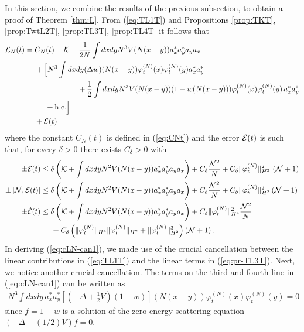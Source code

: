 \documentclass[11pt,a4paper]{article}
\newcommand{\cE}{{\cal E}}
\newcommand{\cK}{{\cal K}}
\newcommand{\cL}{{\cal L}}
\newcommand{\cN}{{\cal N}}
\begin{document}
In this section, we combine the results of the previous subsection, to obtain a proof of Theorem \ref{thm:L}. {F}rom (\ref{eq:TL1T}) and Propositions \ref{prop:TKT}, \ref{prop:TwtL2T}, \ref{prop:TL3T}, \ref{prop:TL4T} it follows that
\begin{equation}\label{eq:cLN-can1} \begin{split} 
\cL_N (t) = \; &C_N (t) + \cK  + \frac{1}{2N}  \int dx dy N^3 V (N (x-y)) a_x^* a_y^* a_y a_x \\
&+ \Big[ N^3 \int dx dy (\Delta w) (N (x-y)) \varphi_t^{(N)} (x) \varphi_t^{(N)} (y)  a_x^* a_y^* \\ 
&\hspace{2cm}+ \frac{1}{2} \int dx dy N^3 V(N (x-y)) (1- w(N(x-y))) \varphi_t^{(N)} (x) \varphi_t^{(N)} (y)\, a_x^* a_y^* \\&\hspace{.5cm}+ \text{h.c.} \Big]  
\\ &+ \cE (t) 
\end{split} \end{equation}
where the constant $C_N (t)$ is defined in (\ref{eq:CNt}) and the error $\cE (t)$ is such that, for every $\delta > 0$ there exists $C_\delta > 0$ with
\begin{equation}\label{eq:cE-tot}
\begin{split} \pm \cE (t) &\leq \delta \left( \cK + \int dx dy N^2 V(N (x-y)) a_x^* a_y^* a_y a_x \right) + C_\delta \frac{\cN^2}{N} + C_\delta \| \varphi_t^{(N)} \|_{H^2}^2 \, \left( \cN + 1 \right) \\
\pm \left[ \cN ,  \cE (t)\right]  &\leq \delta \left( \cK + \int dx dy N^2 V(N (x-y)) a_x^* a_y^* a_y a_x \right) + C_\delta \frac{\cN^2}{N}  + C_\delta \| \varphi^{(N)}_t \|_{H^2}^2 \left( \cN + 1 \right)\\
\pm \dot{\cE} (t) & \leq \delta \left( \cK + \int dx dy N^2 V(N (x-y)) a_x^* a_y^* a_y a_x \right) + C_\delta \| \varphi_t^{(N)} \|_{H^4}^2 \frac{\cN^2}{N} \\ &\hspace{.5cm} + C_\delta \left( \| \varphi_t^{(N)} \|_{H^4}  \| \varphi_t^{(N)} \|_{H^2} + \| \varphi_t^{(N)} \|_{H^2}^3 \right) \left(\cN+1 \right). 
\end{split} \end{equation}
In deriving (\ref{eq:cLN-can1}), we made use of the crucial cancellation between the linear contributions in (\ref{eq:TL1T}) and the linear terms in (\ref{eq:pr-TL3T}).  Next, we notice another crucial cancellation. The terms on the third and fourth line in (\ref{eq:cLN-can1}) can be written as
\[ \begin{split} 
N^3 \int dx dy \, a_x^* a_y^* \left[ \left(-\Delta +\frac{1}{2} V \right)(1-w) \right](N(x-y)) \varphi_t^{(N)} (x) \varphi_t^{(N)} (y) = 0 
\end{split}\]
since $f = 1-w$ is a solution of the zero-energy scattering equation $(-\Delta + (1/2) V)f = 0$.
\end{document}
